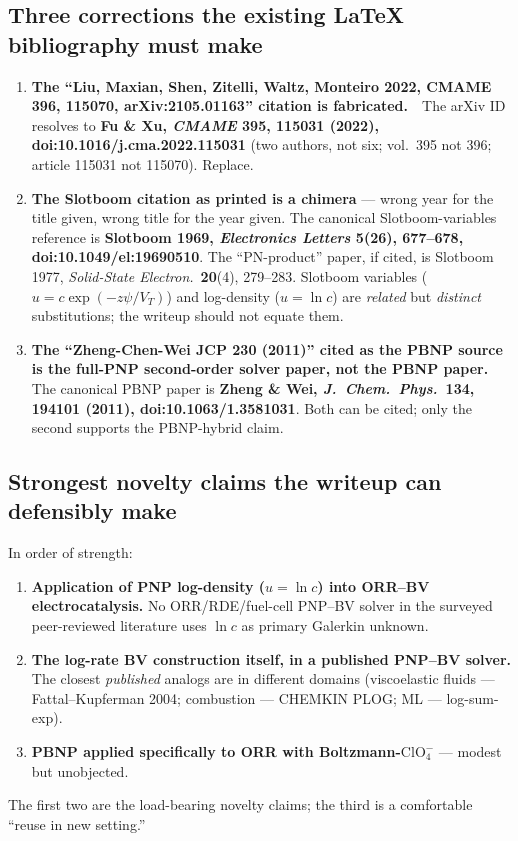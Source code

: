 \documentclass[11pt]{article}
\newcommand{\VT}{V_{T}}
\newcommand{\ClOf}{\mathrm{ClO}_4^{-}}
\begin{document}
\subsection*{Three corrections the existing LaTeX bibliography must make}

\begin{enumerate}
\item \textbf{The ``Liu, Maxian, Shen, Zitelli, Waltz, Monteiro 2022, CMAME 396,
      115070, arXiv:2105.01163'' citation is fabricated.}\ \ The arXiv ID
      resolves to \textbf{Fu \& Xu, \emph{CMAME} \textbf{395}, 115031 (2022),
      doi:10.1016/j.cma.2022.115031} (two authors, not six; vol.~395 not 396;
      article 115031 not 115070). Replace.
\item \textbf{The Slotboom citation as printed is a chimera} --- wrong year for
      the title given, wrong title for the year given. The canonical
      Slotboom-variables reference is \textbf{Slotboom 1969, \emph{Electronics
      Letters} \textbf{5}(26), 677--678, doi:10.1049/el:19690510}. The
      ``PN-product'' paper, if cited, is Slotboom 1977, \emph{Solid-State
      Electron.}\ \textbf{20}(4), 279--283. Slotboom variables
      ($u=c\exp(-z\psi/\VT)$) and log-density ($u=\ln c$) are \emph{related}
      but \emph{distinct} substitutions; the writeup should not equate them.
\item \textbf{The ``Zheng-Chen-Wei JCP 230 (2011)'' cited as the PBNP source is
      the full-PNP second-order solver paper, not the PBNP paper.} The
      canonical PBNP paper is \textbf{Zheng \& Wei, \emph{J.~Chem.~Phys.}\
      \textbf{134}, 194101 (2011), doi:10.1063/1.3581031}. Both can be cited;
      only the second supports the PBNP-hybrid claim.
\end{enumerate}

\subsection*{Strongest novelty claims the writeup can defensibly make}

In order of strength:
\begin{enumerate}
\item \textbf{Application of PNP log-density ($u=\ln c$) into ORR--BV
      electrocatalysis.} No ORR/RDE/fuel-cell PNP--BV solver in the surveyed
      peer-reviewed literature uses $\ln c$ as primary Galerkin unknown.
\item \textbf{The log-rate BV construction itself, in a published PNP--BV
      solver.} The closest \emph{published} analogs are in different domains
      (viscoelastic fluids --- Fattal--Kupferman 2004; combustion --- CHEMKIN
      PLOG; ML --- log-sum-exp).
\item \textbf{PBNP applied specifically to ORR with Boltzmann-$\ClOf$} ---
      modest but unobjected.
\end{enumerate}
The first two are the load-bearing novelty claims; the third is a comfortable
``reuse in new setting.''
\end{document}
